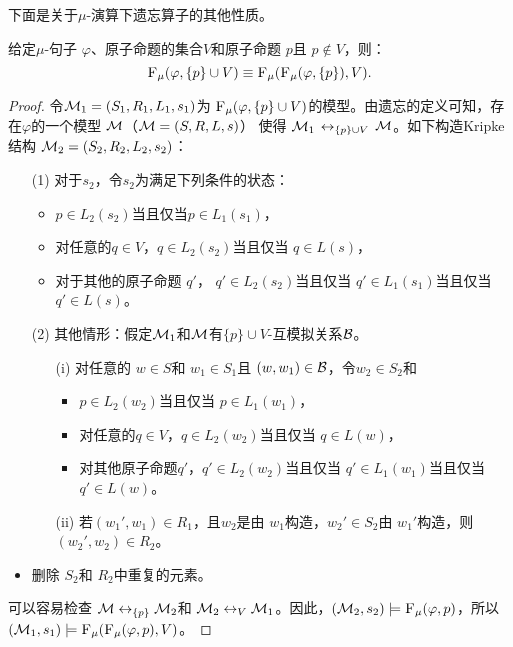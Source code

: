 


下面是关于$\mu$-演算下遗忘算子的其他性质。


\begin{proposition}[分解性]\label{chapter06:disTF}  给定$\mu$-句子 $\varphi$、原子命题的集合$V$和原子命题 $p$且 $p \notin V$，则：
	\[
	{\textsc{F}_{\textsc{$\mu$}}}(\varphi, \{p\} \cup V) \equiv {\textsc{F}_{\textsc{$\mu$}}}({\textsc{F}_{\textsc{$\mu$}}}(\varphi, \{p\}), V).
	\]
\end{proposition}
\begin{proof}
	令${\cal M}_1=(S_1, R_1, L_1, s_1)$为 ${\textsc{F}_{\textsc{$\mu$}}}(\varphi, \{p\} \cup V)$的模型。由遗忘的定义可知，存在$\varphi$的一个模型 ${\cal M}$（${\cal M} = (S, R,L, s)$） 使得 ${\cal M}_1$ $\leftrightarrow_{\{p\} \cup V}$ ${\cal M}$。如下构造Kripke结构 ${\cal M}_2 = (S_2, R_2, L_2, s_2)$：
	\begin{itemize}
		\item[(1)] 对于$s_2$，令$s_2$为满足下列条件的状态：
		\begin{itemize}
			\item $p \in L_2(s_2)$当且仅当$p \in L_1(s_1)$，
			\item 对任意的$q \in V$，$q \in L_2(s_2)$当且仅当 $q\in L(s)$，
			\item 对于其他的原子命题 $q'$， $q' \in L_2(s_2)$当且仅当 $q' \in L_1(s_1)$当且仅当 $q'\in L(s)$。
		\end{itemize}
		\item[(2)] 其他情形：假定${\cal M}_1$和${\cal M}$有$\{p\} \cup V$-互模拟关系${\cal B}$。
		\begin{itemize}
			\item[(i)] 对任意的 $w \in S$和 $w_1 \in S_1$且 $(w,w_1)\in {\cal B}$，令$w_2 \in S_2$和
			\begin{itemize}
				\item $p \in L_2(w_2)$当且仅当 $p \in L_1(w_1)$，
				\item 对任意的$q \in V$，$q \in L_2(w_2)$当且仅当 $q\in L(w)$，
				\item 对其他原子命题$q'$，$q' \in L_2(w_2)$当且仅当 $q' \in L_1(w_1)$当且仅当 $q'\in L(w)$。
			\end{itemize}
			\item[(ii)] 若$(w_1', w_1)\in R_1$，且$w_2$是由 $w_1$构造，$w_2'\in S_2$由 $w_1'$构造，则$(w_2', w_2)\in R_2$。
		\end{itemize}
		\item 删除 $S_2$和 $R_2$中重复的元素。
	\end{itemize}
	可以容易检查 ${\cal M} \leftrightarrow_{\{p\}} {\cal M}_2$和 ${\cal M}_2 \leftrightarrow_V {\cal M}_1$。因此，$({\cal M}_2, s_2) \models {\textsc{F}_{\textsc{$\mu$}}}(\varphi, p)$，所以 $({\cal M}_1, s_1) \models {\textsc{F}_{\textsc{$\mu$}}}({\textsc{F}_{\textsc{$\mu$}}}(\varphi, p), V)$。
	

\end{proof}
